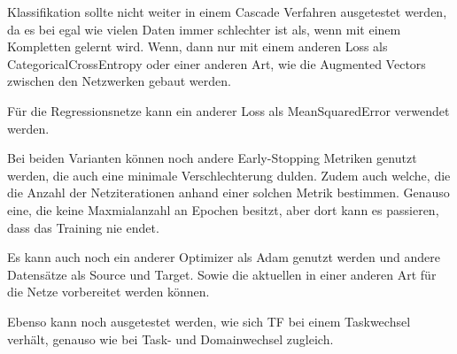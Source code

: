 
Klassifikation sollte nicht weiter in einem Cascade Verfahren ausgetestet werden, da es bei egal wie vielen Daten 
immer schlechter ist als, wenn mit einem Kompletten gelernt wird. Wenn, dann nur mit einem anderen Loss als 
CategoricalCrossEntropy oder einer anderen Art, wie die Augmented Vectors zwischen den Netzwerken gebaut werden. 

Für die Regressionsnetze kann ein anderer Loss als MeanSquaredError verwendet werden. 

Bei beiden Varianten können noch andere Early-Stopping Metriken genutzt werden, die auch eine minimale Verschlechterung dulden. Zudem auch 
welche, die die Anzahl der Netziterationen anhand 
einer solchen Metrik bestimmen. Genauso eine, die keine Maxmialanzahl an Epochen besitzt, aber dort kann es passieren, dass das Training nie endet. 

Es kann auch noch ein anderer Optimizer als Adam genutzt werden und andere Datensätze als Source und Target. Sowie die aktuellen in einer anderen 
Art für die Netze vorbereitet werden können. 

Ebenso kann noch ausgetestet werden, wie sich TF bei einem Taskwechsel verhält, genauso wie bei Task- und Domainwechsel zugleich. 
